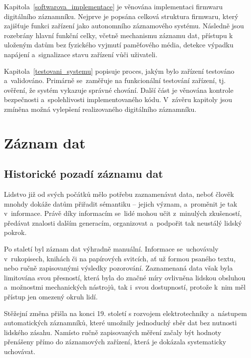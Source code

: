 Kapitola~\ref{softwarova_implementace} je věnována implementaci firmwaru digitálního záznamníku. Nejprve je popsána celková struktura firmwaru, který zajišťuje funkci zařízení jako autonomního záznamového systému. Následně jsou rozebrány hlavní funkční celky, včetně mechanismu záznamu dat, přístupu k uloženým datům bez fyzického vyjmutí paměťového média, detekce výpadku napájení a~signalizace stavu zařízení vůči uživateli.

Kapitola~\ref{testovani_systemu} popisuje proces, jakým bylo zařízení testováno a~validováno. Primárně se~zaměřuje na funkcionální testování zařízení, tj. ověření, že systém vykazuje správné chování. Další část je věnována kontrole bezpečnosti a~spolehlivosti implementovaného kódu. V~závěru kapitoly jsou zmíněna možná vylepšení realizovaného digitálního záznamníku.


\chapter{Záznam dat}
\label{zaznam_dat}

\section{Historické pozadí záznamu dat}
\label{pocatky}
Lidstvo již od svých počátků mělo potřebu zaznamenávat data, neboť člověk mnohdy dokáže datům přiřadit sémantiku -- jejich význam, a~proměnit je tak v~informace. Právě díky informacím se~lidé mohou učit z~minulých zkušeností, předávat znalosti dalším generacím, organizovat a~podpořit tak neustálý lidský pokrok.

Po staletí byl záznam dat výhradně manuální. Informace se~uchovávaly v~rukopisech, knihách či na papírových svitcích, ať už formou psaného textu, nebo ručně zapisovanými výsledky pozorování. Zaznamenaná data však byla limitována svou přesností, která byla do značné míry ovlivněna lidskou obsluhou a~možnostmi mechanických nástrojů, tak i~svou dostupností, protože k~nim měl přístup jen omezený okruh lidí.~\cite{rcp_analog_vs_digital}

Stěžejní změna přišla na konci 19. století s rozvojem elektrotechniky a~nástupem automatických záznamníků, které umožnily jednoduchý sběr dat bez nutnosti lidského zásahu. Namísto ručně zapisovaných měření začaly být hodnoty přenášeny přímo do záznamových zařízení, která je dokázala systematicky uchovávat.~\cite{origin_of_chart_recorders}

